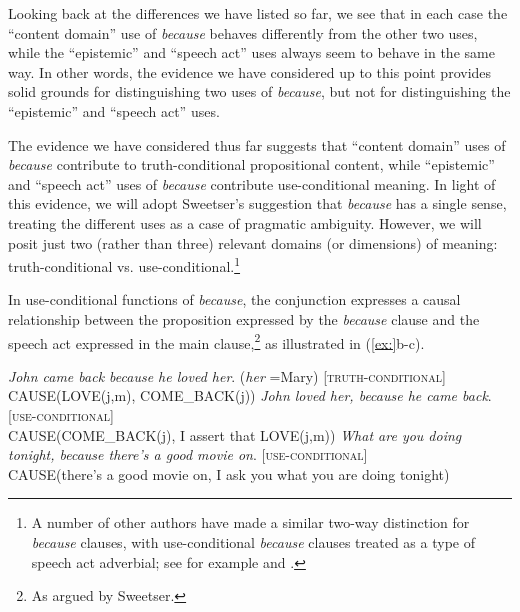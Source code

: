 \ea
{}
\z \z


Looking back at the differences we have listed so far, we see that in each case the “content domain” use of \textit{because} behaves differently from the other two uses, while the “epistemic” and “speech act” uses always seem to behave in the same way. In other words, the evidence we have considered up to this point provides solid grounds for distinguishing two uses of \textit{because}, but not for distinguishing the “epistemic” and “speech act” uses.



The evidence we have considered thus far suggests that “content domain” uses of \textit{because} contribute to truth-conditional propositional content, while “epistemic” and “speech act” uses of \textit{because} contribute use-conditional meaning. In light of this evidence, we will adopt Sweetser’s suggestion that \textit{because} has a single sense, treating the different uses as a case of pragmatic ambiguity. However, we will posit just two (rather than three) relevant domains (or dimensions) of meaning: truth-conditional vs. use-conditional.\footnote{A number of other authors have made a similar two-way distinction for \textit{because} clauses, with use-conditional \textit{because} clauses treated as a type of speech act adverbial; see for example \citet{Scheffler2008,Scheffler2013} and \citet{ThompsonEtAl2007}.} 



In use-conditional functions of \textit{because}, the conjunction expresses a causal relationship between the proposition expressed by the \textit{because} clause and the speech act expressed in the main clause,\footnote{As argued by Sweetser.} as illustrated in (\ref{ex:}b-c).


\ea
\ea \textit{John came back because he loved her}. (\textit{her} =Mary)  [\textsc{truth-conditional}]\\
CAUSE(LOVE(j,m), COME\_BACK(j))
\ex   \textit{John loved her, because he came back}.   [\textsc{use-conditional}]\\
CAUSE(COME\_BACK(j), I assert that LOVE(j,m))
\ex   \textit{What are you doing tonight, because there’s a good movie on}.  [\textsc{use-conditional}]\\
CAUSE(there’s a good movie on, I ask you what you are doing tonight)
\z \z


